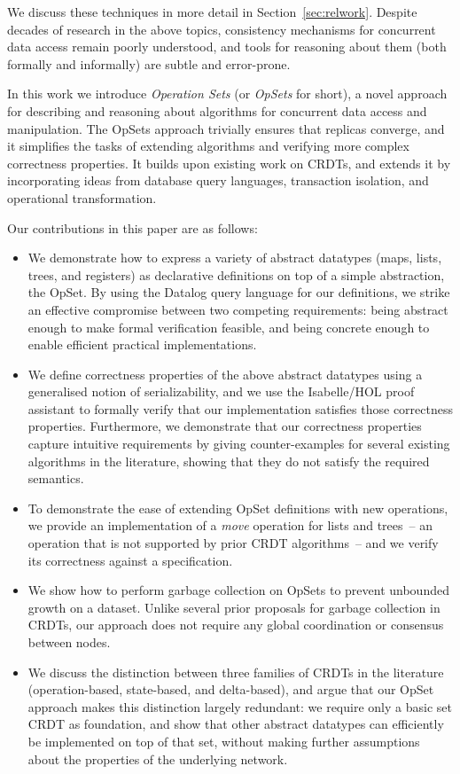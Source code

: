 \documentclass[twocolumn,10pt]{article}
\begin{document}
We discuss these techniques in more detail in Section~\ref{sec:relwork}.
Despite decades of research in the above topics, consistency mechanisms for concurrent data access remain poorly understood, and tools for reasoning about them (both formally and informally) are subtle and error-prone.

In this work we introduce \emph{Operation Sets} (or \emph{OpSets} for short), a novel approach for describing and reasoning about algorithms for concurrent data access and manipulation.
The OpSets approach trivially ensures that replicas converge, and it simplifies the tasks of extending algorithms and verifying more complex correctness properties.
It builds upon existing work on CRDTs, and extends it by incorporating ideas from database query languages, transaction isolation, and operational transformation.

Our contributions in this paper are as follows:

\begin{itemize}
\item We demonstrate how to express a variety of abstract datatypes (maps, lists, trees, and registers) as declarative definitions on top of a simple abstraction, the OpSet.
By using the Datalog query language for our definitions, we strike an effective compromise between two competing requirements: being abstract enough to make formal verification feasible, and being concrete enough to enable efficient practical implementations.

\item We define correctness properties of the above abstract datatypes using a generalised notion of serializability, and we use the Isabelle/HOL proof assistant to formally verify that our implementation satisfies those correctness properties.
Furthermore, we demonstrate that our correctness properties capture intuitive requirements by giving counter-examples for several existing algorithms in the literature, showing that they do not satisfy the required semantics.

\item To demonstrate the ease of extending OpSet definitions with new operations, we provide an implementation of a \emph{move} operation for lists and trees~-- an operation that is not supported by prior CRDT algorithms~-- and we verify its correctness against a specification.

\item We show how to perform garbage collection on OpSets to prevent unbounded growth on a dataset. Unlike several prior proposals for garbage collection in CRDTs, our approach does not require any global coordination or consensus between nodes.

\item We discuss the distinction between three families of CRDTs in the literature (operation-based, state-based, and delta-based), and argue that our OpSet approach makes this distinction largely redundant: we require only a basic set CRDT as foundation, and show that other abstract datatypes can efficiently be implemented on top of that set, without making further assumptions about the properties of the underlying network.
\end{itemize}
\end{document}
